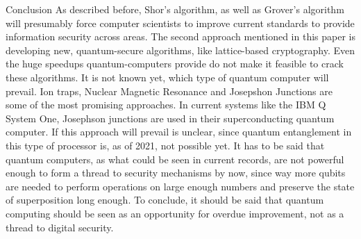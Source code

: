 \documentclass[aps,preprintnumbers,twocolumn]{revtex4}
\begin{document}
\begin{section}{Conclusion}
As described before, Shor's algorithm, 
as well as Grover's algorithm will presumably force computer scientists to improve current standards to provide information security across areas. 
The second approach mentioned in this paper is developing new, 
quantum-secure algorithms, 
like lattice-based cryptography. 
Even the huge speedups quantum-computers provide do not make it feasible to crack these algorithms. 
It is not known yet, which type of quantum computer will prevail. 
Ion traps, Nuclear Magnetic Resonance and Josepshon Junctions are some of the most promising approaches. 
In current systems like the IBM Q System One, 
Josephson junctions are used in their superconducting quantum computer. 
If this approach will prevail is unclear, 
since quantum entanglement in this type of processor is, as of 2021, not possible yet. 
It has to be said that quantum computers, 
as what could be seen in current records,  
are not powerful enough to form a thread to security mechanisms by now, 
since way more qubits are needed to perform operations on large enough numbers and preserve the state of superposition long enough. 
To conclude, it should be said that quantum computing should be seen as an opportunity for overdue improvement, not as a thread to digital security. 
\end{section}



\end{document}
